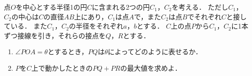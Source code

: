 \documentclass[../../main.tex]{subfiles}
\begin{document}
点$O$を中心とする半径1の円$C$に含まれる2つの円$C_1$，$C_2$を考える．
ただし$C_1$，$C_2$の中心は$C$の直径$AB$上にあり，$C_1$は点$A$で，また$C_2$は点$B$でそれぞれ$C$と接している．
また$C_1$，$C_2$の半径をそれぞれ$a$，$b$とする．
$C$上の点$P$から$C_1$，$C_2$に1本ずつ接線を引き，それらの接点を$Q$，$R$とする．
\begin{enumerate}
  \item $\angle POA=\theta$とするとき，$PQ$は$\theta$によってどのように表せるか．
  \item $P$を$C$上で動かしたときの$PQ+PR$の最大値を求めよ．
\end{enumerate}
\end{document}
